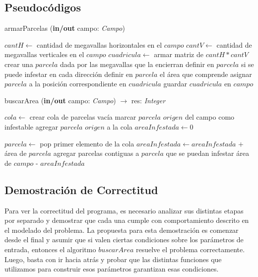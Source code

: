 \clearpage


\subsection{Pseudocódigos}

\begin{algorithm}
\caption{armarParcelas (\textbf{in/out} campo: \textsl{Campo})}
\begin{algorithmic}[1]

\STATE $cantH \leftarrow$ cantidad de megavallas horizontales en el $campo$
\STATE $cantV \leftarrow$ cantidad de megavallas verticales en el $campo$
\STATE $cuadricula \leftarrow$ armar matriz de $cantH*cantV$
		\STATE crear una $parcela$ dada por las megavallas que la encierran
		\STATE definir en $parcela$ si se puede infestar en cada dirección
		\STATE definir en $parcela$ el área que comprende
		\STATE asignar $parcela$ a la posición correspondiente en $cuadricula$
	\ENDWHILE
\ENDWHILE
\STATE guardar $cuadricula$ en $campo$
\end{algorithmic}
\end{algorithm}

\begin{algorithm}
\caption{buscarArea (\textbf{in/out} campo: \textsl{Campo}) $\rightarrow$ res: \textsl{Integer}}
\begin{algorithmic}[1]

\STATE $cola \leftarrow$ crear cola de parcelas vacía
\STATE marcar $parcela$ $origen$ del campo como infestable
\STATE agregar $parcela$ $origen$ a la cola
\STATE $areaInfestada \leftarrow 0$

	\STATE $parcela \leftarrow$ pop primer elemento de la cola
	\STATE $areaInfestada \leftarrow areaInfestada$ $+$ área de $parcela$ 
	\STATE agregar parcelas contiguas a $parcela$ que se puedan infestar
\ENDWHILE
\RETURN área de $campo$ - $areaInfestada$
\end{algorithmic}
\end{algorithm}

\clearpage

\subsection{Demostración de Correctitud}

Para ver la correctitud del programa, es necesario analizar sus distintas etapas por separado y demostrar que cada una cumple con comportamiento descrito en el modelado del problema. La propuesta para esta demostración es comenzar desde el final y asumir que si valen ciertas condiciones sobre los parámetros de entrada, entonces el algoritmo $buscarArea$ resuelve el problema correctamente. Luego, basta con ir hacia atrás y probar que las distintas funciones que utilizamos para construir esos parámetros garantizan esas condiciones.\\

